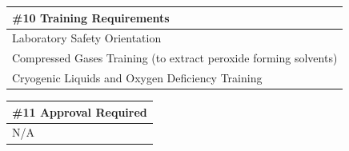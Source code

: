 \documentclass{article}
\begin{document}
\begin{center}
\begin{tabular}{ |p{\textwidth}| }
\hline
\cellcolor{gray!25} \#10 \textbf{Training Requirements} \\
\hline
Laboratory Safety Orientation \\
Compressed Gases Training (to extract peroxide forming solvents) \\
Cryogenic Liquids and Oxygen Deficiency Training
\\ \hline
\end{tabular}
\end{center}

\begin{center}
\begin{tabular}{ |p{\textwidth}| }
\hline
\cellcolor{gray!25} \#11 \textbf{Approval Required} \\
\hline
N/A
\\ \hline
\end{tabular}
\end{center}
\end{document}
